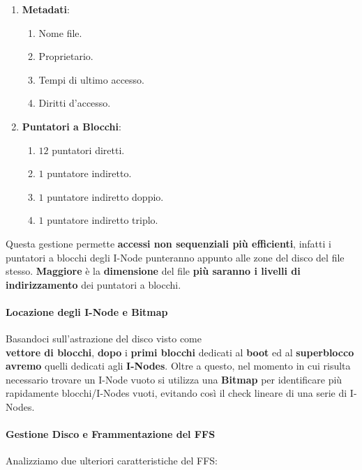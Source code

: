 \documentclass{article}
\begin{document}
\begin{enumerate}
    \item \textbf{Metadati}:
    \begin{enumerate}
        \item Nome file.
        \item Proprietario.
        \item Tempi di ultimo accesso.
        \item Diritti d'accesso.
    \end{enumerate}
    \item \textbf{Puntatori a Blocchi}:
    \begin{enumerate}
        \item $12$ puntatori diretti.
        \item $1$ puntatore indiretto.
        \item $1$ puntatore indiretto doppio.
        \item $1$ puntatore indiretto triplo.
    \end{enumerate}
\end{enumerate}

Questa gestione permette \textbf{accessi non sequenziali più efficienti}, infatti i puntatori a blocchi degli I-Node punteranno appunto alle zone del disco del file stesso. \textbf{Maggiore} è la \textbf{dimensione} del file \textbf{più saranno i livelli di indirizzamento} dei puntatori a blocchi.

\paragraph{Locazione degli I-Node e Bitmap}

Basandoci sull'astrazione del disco visto come \\ \textbf{vettore di blocchi}, \textbf{dopo} i \textbf{primi blocchi} dedicati al \textbf{boot} ed al \textbf{superblocco} \textbf{avremo} quelli dedicati agli \textbf{I-Nodes}. Oltre a questo, nel momento in cui risulta necessario trovare un I-Node vuoto si utilizza una \textbf{Bitmap} per identificare più rapidamente blocchi/I-Nodes vuoti, evitando così il check lineare di una serie di I-Nodes.

\paragraph{Gestione Disco e Frammentazione del FFS}

Analizziamo due ulteriori caratteristiche del FFS:
\end{document}
